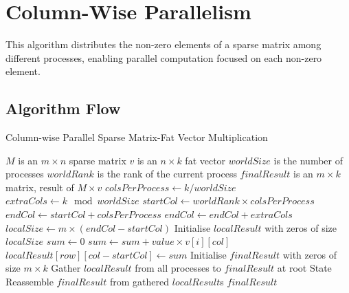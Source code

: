 \documentclass[12pt,oneside]{book} %
\begin{document}
\newpage
\section{Column-Wise Parallelism}
This algorithm distributes the non-zero elements of a sparse matrix among
different processes, enabling parallel computation focused on each non-zero
element.

\subsection{Algorithm Flow}

\begin{algorithm}[H]
    \caption{Column-wise Parallel Sparse Matrix-Fat Vector Multiplication}
    \begin{algorithmic}
        \Require $M$ is an $m \times n$ sparse matrix
        \Require $v$ is an $n \times k$ fat vector
        \Require $worldSize$ is the number of processes
        \Require $worldRank$ is the rank of the current process
        \Ensure  $finalResult$ is an $m \times k$ matrix, result of $M \times v$
        \State $colsPerProcess \gets k / worldSize$
        \State $extraCols \gets k \mod worldSize$
        \State $startCol \gets worldRank \times colsPerProcess$
        \State $endCol \gets startCol + colsPerProcess$
        \State $endCol \gets endCol + extraCols$
        \EndIf
        \State $localSize \gets m \times (endCol - startCol)$
        \State Initialise $localResult$ with zeros of size $localSize$
        \State $sum \gets 0$
        \State $sum \gets sum + value \times v[i][col]$
        \EndFor
        \State $localResult[row][col - startCol] \gets sum$
        \EndFor
        \EndFor
        \State Initialise $finalResult$ with zeros of size $m \times k$
        \EndIf
        \State Gather $localResult$ from all processes to $finalResult$ at root
        \State State Reassemble $finalResult$ from gathered $localResult$s
        \State \Return $finalResult$
        \EndIf
    \end{algorithmic}
\end{algorithm}
\end{document}
